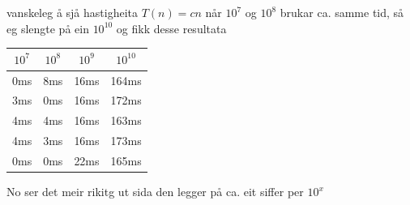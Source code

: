 \documentclass{article}
\begin{document}
vanskeleg å sjå hastigheita $T(n) = cn$ når $10^7$ og $10^8$ 
brukar ca. samme tid, så eg slengte på ein $10^{10}$ og fikk desse resultata

\begin{center}
\begin{tabular}{ |c|c|c|c| } 
        \hline
        $10^7$ & $10^8$ & $10^9$ & $10^{10}$\\ 
        \hline
        0ms & 8ms & 16ms & 164ms \\ 
        3ms & 0ms & 16ms & 172ms \\ 
        4ms & 4ms & 16ms & 163ms \\ 
        4ms & 3ms & 16ms & 173ms \\
        0ms & 0ms & 22ms & 165ms \\
        \hline
\end{tabular}
\end{center}

No ser det meir rikitg ut sida den legger på ca. eit
siffer per $10^x$ 
\end{document}
